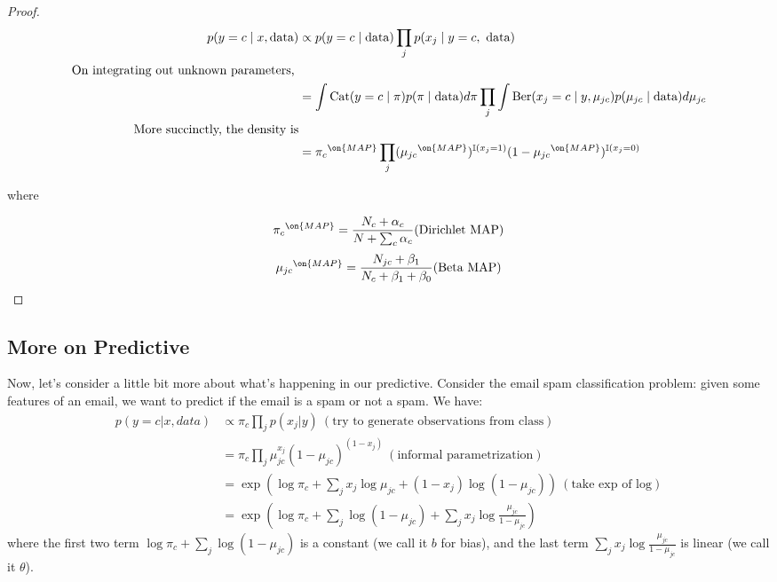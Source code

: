 \documentclass{article}
\begin{document}
\begin{proof} 
\begin{align*}
   p(y = c \mid  x, \text{data})  &\propto p(y = c \mid \text{data}) \prod_j p(x_j\mid y = c, \text{ data})\\
\text{On integrating out unknown parameters, } \\
&= \int \text{Cat}(y = c \mid \pi)p(\pi\mid\text{data} )d\pi \prod_j \int \text{Ber}(x_j = c \mid y,\mu_{jc})p(\mu_{jc}\mid\text{data} )d\mu_{jc}\\
\text{More succinctly, the density is}  \\
  &= {\pi_c}^{\on{MAP}}\prod_j ({\mu_{jc}}^{\on{MAP}})^{\mathbb{I} (x_j = 1)}(1-{\mu_{jc}}^{\on{MAP}})^{\mathbb{I} (x_j = 0)} 
\end{align*}

where

\[ {\pi_c}^{\on{MAP}} = \frac{N_c + \alpha_c}{N + \sum_c \alpha_c} (\text{Dirichlet MAP}) \] 
\[{\mu_{jc}}^{\on{MAP}} = \frac{N_{jc} + \beta_1}{N_c + \beta_1 + \beta_0} (\text{Beta MAP})\] 

\end{proof}

\subsection{More on Predictive}
Now, let's consider a little bit more about what's happening in our predictive. Consider the email spam classification problem: given some features of an email, we want to predict if the email is a spam or not a spam. We have:
\begin{align*}
    p(y = c | x, data) &\propto \pi_c \prod_j p(x_j|y) \> (\text{try to generate observations from class}) \\
    &= \pi_c \prod_j \mu_{jc}^{x_j} (1-\mu_{jc})^{(1-x_j)} \> (\text{informal parametrization})\\
    &= \exp(\log \pi_c + \sum_j x_j \log \mu_{jc} + (1-x_j) \log(1 - \mu_{jc})) \> (\text{take exp of log})\\
    &= \exp\left(\log \pi_c + \sum_j \log(1-\mu_{jc}) + \sum_j x_j \log\frac{\mu_{jc}}{1-\mu_{jc}}\right)
\end{align*}
where the first two term $\log \pi_c + \sum_j \log(1-\mu_{jc})$ is a constant (we call it $b$ for bias), and the last term $\sum_j x_j \log\frac{\mu_{jc}}{1-\mu_{jc}}$ is linear (we call it $\theta$).
\end{document}
